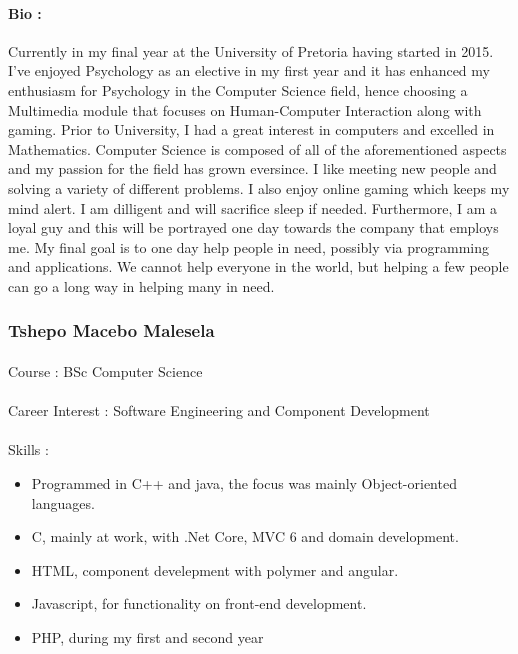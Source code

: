 \documentclass[11pt]{article}
\begin{document}
\paragraph{Bio :}Currently in my final year at the University of Pretoria having started in 2015. I've enjoyed Psychology as an elective in my first year and it has enhanced my enthusiasm for Psychology in the Computer Science field, hence choosing a Multimedia module that focuses on Human-Computer Interaction along with gaming. Prior to University, I had a great interest in computers and excelled in Mathematics. Computer Science is composed of all of the aforementioned aspects and my passion for the field has grown eversince. I like meeting new people and solving a variety of different problems. I also enjoy online gaming which keeps my mind alert. I am dilligent and will sacrifice sleep if needed. Furthermore, I am a loyal guy and this will be portrayed one day towards the company that employs me. My final goal is to one day help people in need, possibly via programming and applications. We cannot help everyone in the world, but helping a few people can go a long way in helping many in need.

\subsubsection{Tshepo Macebo Malesela}
\paragraph{}Course : BSc Computer Science
\paragraph{}Career Interest : Software Engineering and Component Development
\paragraph{}Skills : 
\begin{itemize}
\item Programmed in C++ and java, the focus was mainly Object-oriented languages.
\item C, mainly at work, with .Net Core, MVC 6 and domain development.
\item HTML, component develepment with polymer and angular.
\item Javascript, for functionality on front-end development.
\item PHP, during my first and second year
\end{itemize}
\end{document}
